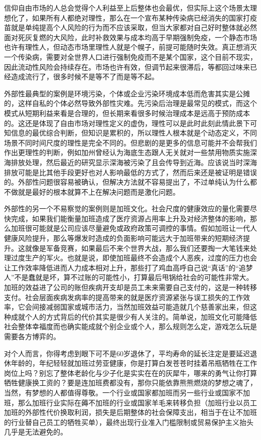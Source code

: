 \documentclass[
]{book}
\begin{document}
信仰自由市场的人总会觉得个人利益至上后整体也会最优，但实际上这个场景太理想化了，如果所有人都绝对理性，那么在一个宣布某种传染病已经消失的国家打疫苗就是单纯提高个人风险的行为而不应该采取，但当大家都对自己好时整体就必然面对死灰复燃的大风险，此时补救效果与成本均高于早期强制免疫，一个静态市场也许有理性人，但动态市场里理性人就是个幌子，前提可能随时失效。真正想消灭一个传染病，需要对全世界人口进行强制免疫而不是某个国家，这个目前不现实，因此流动性风险会持续存在。市场也许有效，但调节起来很滞后，等都回过味来已经造成流行了，很多时候不是等不了而是等不起。

外部性最典型的案例是环境污染，个体或企业污染环境成本低而危害其实是公摊的，这样自私的个体必然导致外部性灾难。先污染后治理是最常见的模式，而这个模式从短期利益来看是合理的，但长期来看很多时候治理成本是远高于预防成本的。这还是体现了自由市场对理性定义的虚伪，理性可以是此时此刻此情此景下可知信息的最优综合判断，但知识是累积的，所以理性人根本就是个动态定义，不同场景不同时间尺度的理性是完全不同的。但悲剧的是更多的信息可能并不会帮我们作出更理性的判断，例如加州曾经认为海底生态跟人无关就对一些禁用物质实施深海排放处理，然后最近的研究显示深海被污染了且会传导到近海。应该说当时深海排放可能是比其他手段更好也对人影响最低的方式了，然而后来还是被证明是错误的。外部性问题很容易被确认，但解决方法就不容易提出了，不过单纯认为什么都不做就是最好的根本就算不上在解决问题而是激化问题。

外部性的另一个不易察觉的案例则是加班文化。社会尺度的健康效应的量化需要尽快完成，如果我们能衡量加班造成了医疗资源占用率上升及对经济整体的影响，那么加班很可能就是公司应该尽量避免或政府政策可调控的事情。假如加班让一代人健康风险提升，那么等爆发时造成的负面影响可能远大于加班带来的短期经济提升。这就像是军备竞赛，如果最后不来个世界大战，那么我们还要掏一大笔钱来处理过度生产的军火。也就是说，即使加班最终不会造成个人恶疾，过度的压力也会让工作效率降低进而人力成本相对上升，那些打了鸡血高呼自己说``真话''的``追梦人''不是蠢就是坏，算不过账的可能性小，打算最后甩锅给社会的可能性非常大。加班的效益进了公司的账但疾病开支却是员工未来需要自己支付的，这是一种转移支付。社会层面疾病发病率的提高带来的就是医疗资源紧张与误工损失的工作效率，它会间接减弱国家或城市活力，当然加班效益可能造就几个慈善家出来，但这种成就个人的方式背后的代价其实是很少有人关注的。简单说，加班文化可能降低社会整体幸福度而也确实能成就个别企业或个人，那么规则怎么定，游戏怎么玩是需要各方博弈的。

对个人而言，你得考虑到眼下可不是60岁退休了，平均寿命的延长注定是要延迟退休年龄的，年纪轻轻就加班过劳亚健康，你是打算白发苍苍时挂着吊瓶牺牲在工作岗位上吗？别忘了整体老龄化与少子化是实实在在的灰犀牛，哪来的勇气让你打算牺牲健康换工资的？要是连加班费都没有，那你只能依靠熊熊燃烧的梦想之魂了，当然，有梦想的人都值得尊敬。一个行业或国家都加班而另一些行业或国家不加班，那么加班行业实际在薅不加班的行业或国家羊毛来转移负担（加班行业以员工加班的外部性代价换取利润，损失是后期整体的社会保障支出，相当于在让不加班的行业替自己员工的牺牲买单），最终出现行业准入门槛限制或贸易保护主义抬头几乎是无法避免的。
\end{document}
